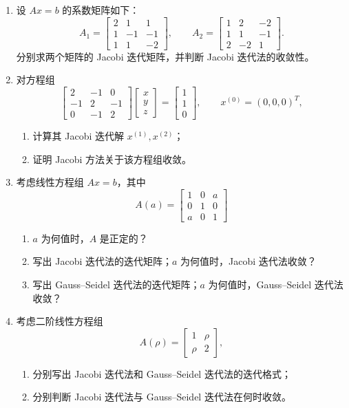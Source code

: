 \documentclass{article}
\begin{document}
\begin{enumerate}
  \item 设 $Ax=b$ 的系数矩阵如下：
  \[
    A_1=\begin{bmatrix}2&1&1\\1&-1&-1\\1&1&-2\end{bmatrix},\qquad
    A_2=\begin{bmatrix}1&2&-2\\1&1&-1\\2&-2&1\end{bmatrix}.
  \]
  分别求两个矩阵的 Jacobi 迭代矩阵，并判断 Jacobi 迭代法的收敛性。

  \item 对方程组
  \[
    \begin{bmatrix}2&-1&0\\-1&2&-1\\0&-1&2\end{bmatrix}
    \begin{bmatrix}x\\y\\z\end{bmatrix}
    =
    \begin{bmatrix}1\\1\\0\end{bmatrix},\qquad x^{(0)}=(0,0,0)^T,
  \]
  \begin{enumerate}[(1)]
    \item 计算其 Jacobi 迭代解 $x^{(1)},x^{(2)}$；
    \item 证明 Jacobi 方法关于该方程组收敛。
  \end{enumerate}

  \item 考虑线性方程组 $Ax=b$，其中
  \[
    A(a)=\begin{bmatrix}1&0&a\\0&1&0\\a&0&1\end{bmatrix}
  \]
  \begin{enumerate}[(1)]
    \item $a$ 为何值时，$A$ 是正定的？
    \item 写出 Jacobi 迭代法的迭代矩阵；$a$ 为何值时，Jacobi 迭代法收敛？
    \item 写出 Gauss--Seidel 迭代法的迭代矩阵；$a$ 为何值时，Gauss--Seidel 迭代法收敛？
  \end{enumerate}

  \item 考虑二阶线性方程组
  \[
    A(\rho)=\begin{bmatrix}1&\rho\\ \rho&2\end{bmatrix},
  \]
  \begin{enumerate}[(1)]
    \item 分别写出 Jacobi 迭代法和 Gauss--Seidel 迭代法的迭代格式；
    \item 分别判断 Jacobi 迭代法与 Gauss--Seidel 迭代法在何时收敛。
  \end{enumerate}


\end{enumerate}
\end{document}
